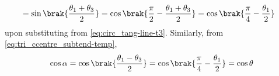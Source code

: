 \begin{enumerate}[label=\thesection.\arabic*.,ref=\thesection.\theenumi]
\begin{align}
{			  } 
			  \\
			  &=
	    \sin \brak{\frac{\theta_1+\theta_3}{2}}
	    =\cos\brak{\frac{\pi}{2}-\frac{\theta_1+\theta_3}{2}}
	    =\cos\brak{\frac{\pi}{4}-\frac{\theta_1}{2}}
  \end{align}
  upon substituting from 
		\eqref{eq:circ_tang-line-t3}.  Similarly, 	
		from
\eqref{eq:tri_ccentre_subtend-temp},
  \begin{align}
	  \cos \alpha = \cos \brak{\frac{\theta_1-\theta_3}{2}  }
	    =\cos\brak{\frac{\pi}{4}-\frac{\theta_1}{2}}
	  =\cos \theta
  \end{align}
%
\iffalse
Using Theorem \ref{them:tang_icept_ang},
\begin{equation}
\triangle PAC \sim \triangle PBC \quad (AAA)
\end{equation}
 Hence,
%
\begin{align}
\frac{PA}{PC} &= \frac{PC}{PB} \\
\implies PA.PB &=PC^2
\end{align}
%
%
%
\item
	In Fig. \ref{fig:chord_tang_prod}, show that
\begin{equation}
	PA.PB = PC.PD
	\end{equation}
%
\begin{figure}[!ht]
	\begin{center}
		
		\resizebox{\columnwidth}{!}{}
	\end{center}
	\caption{$PA.PB = PC^2$.}
	\label{fig:chord_tang_prod}	
\end{figure}
\\
\solution From Theorem \ref{them:circ_tang_icept_prod}, if $PT$ be a tangent to the circle, 	
\begin{equation}
	PA.PB = PT^2 =PC.PD
	\end{equation}
	\fi
\end{enumerate}
%
